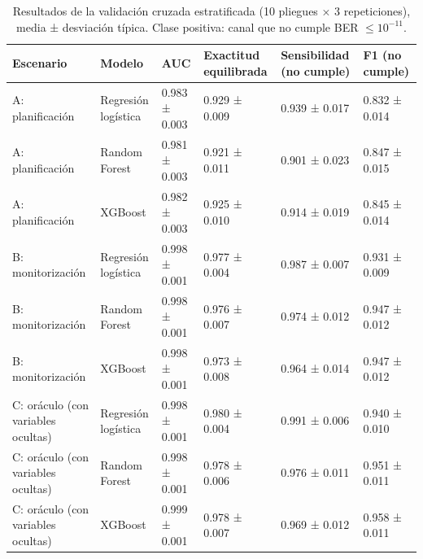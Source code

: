 \begin{table}
\caption{Resultados de la validación cruzada estratificada (10 pliegues × 3 repeticiones), media ± desviación típica. Clase positiva: canal que no cumple BER $\leq 10^{-11}$.}
\label{tab:resultados}
\begin{tabular}{llllll}
\toprule
Escenario & Modelo & AUC & Exactitud equilibrada & Sensibilidad (no cumple) & F1 (no cumple) \\
\midrule
A: planificación & Regresión logística & 0.983 ± 0.003 & 0.929 ± 0.009 & 0.939 ± 0.017 & 0.832 ± 0.014 \\
A: planificación & Random Forest & 0.981 ± 0.003 & 0.921 ± 0.011 & 0.901 ± 0.023 & 0.847 ± 0.015 \\
A: planificación & XGBoost & 0.982 ± 0.003 & 0.925 ± 0.010 & 0.914 ± 0.019 & 0.845 ± 0.014 \\
B: monitorización & Regresión logística & 0.998 ± 0.001 & 0.977 ± 0.004 & 0.987 ± 0.007 & 0.931 ± 0.009 \\
B: monitorización & Random Forest & 0.998 ± 0.001 & 0.976 ± 0.007 & 0.974 ± 0.012 & 0.947 ± 0.012 \\
B: monitorización & XGBoost & 0.998 ± 0.001 & 0.973 ± 0.008 & 0.964 ± 0.014 & 0.947 ± 0.012 \\
C: oráculo (con variables ocultas) & Regresión logística & 0.998 ± 0.001 & 0.980 ± 0.004 & 0.991 ± 0.006 & 0.940 ± 0.010 \\
C: oráculo (con variables ocultas) & Random Forest & 0.998 ± 0.001 & 0.978 ± 0.006 & 0.976 ± 0.011 & 0.951 ± 0.011 \\
C: oráculo (con variables ocultas) & XGBoost & 0.999 ± 0.001 & 0.978 ± 0.007 & 0.969 ± 0.012 & 0.958 ± 0.011 \\
\bottomrule
\end{tabular}
\end{table}
